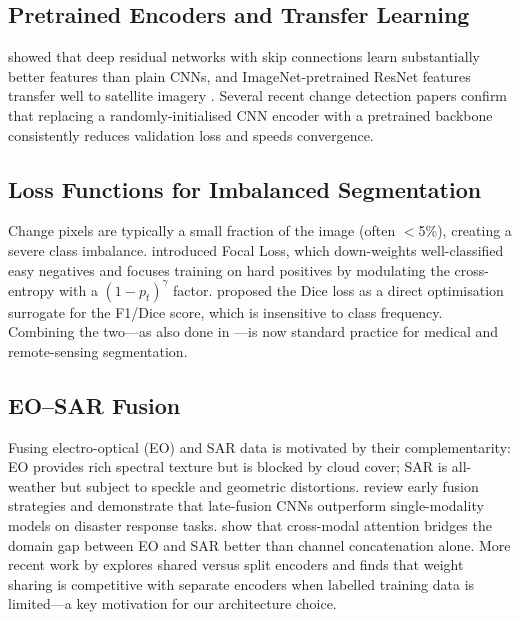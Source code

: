 \documentclass[12pt,a4paper]{article}
\begin{document}
\subsection{Pretrained Encoders and Transfer Learning}

\citet{he2016resnet} showed that deep residual networks with skip connections learn
substantially better features than plain CNNs, and ImageNet-pretrained ResNet
features transfer well to satellite imagery \citep{marmanis2016deep}.  Several recent
change detection papers \citep{fang2021snunet, changeformer2022} confirm that replacing a
randomly-initialised CNN encoder with a pretrained backbone consistently reduces
validation loss and speeds convergence.

\subsection{Loss Functions for Imbalanced Segmentation}

Change pixels are typically a small fraction of the image (often $<$5\%), creating
a severe class imbalance.  \citet{lin2017focal} introduced Focal Loss, which down-weights
well-classified easy negatives and focuses training on hard positives by modulating the
cross-entropy with a $(1-p_t)^\gamma$ factor.  \citet{milletari2016vnet} proposed the Dice
loss as a direct optimisation surrogate for the F1/Dice score, which is insensitive to
class frequency.  Combining the two---as also done in \citet{isensee2021nnu}---is now
standard practice for medical and remote-sensing segmentation.

\subsection{EO–SAR Fusion}

Fusing electro-optical (EO) and SAR data is motivated by their complementarity: EO
provides rich spectral texture but is blocked by cloud cover; SAR is all-weather but
subject to speckle and geometric distortions.  \citet{schmitt2016fusion} review early
fusion strategies and demonstrate that late-fusion CNNs outperform single-modality models
on disaster response tasks.  \citet{zhao2017fusion} show that cross-modal attention
bridges the domain gap between EO and SAR better than channel concatenation alone.
More recent work by \citet{li2022eo_sar} explores shared versus split encoders and finds
that weight sharing is competitive with separate encoders when labelled training data is
limited---a key motivation for our architecture choice.
\end{document}
